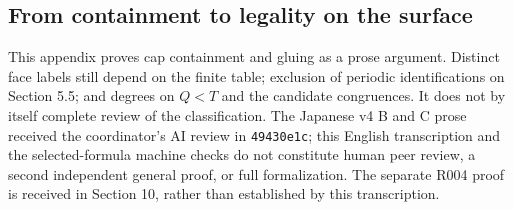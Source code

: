 \documentclass[11pt]{amsart}
\newcommand{\record}[1]{\nolinkurl{#1}}
\begin{document}
\subsection{From containment to legality on the surface}
This appendix proves cap containment and gluing as a prose argument.
Distinct face labels still depend on the finite table; exclusion of
periodic identifications on Section 5.5; and degrees on $Q<T$ and the
candidate congruences. It does not by itself complete review of the
classification. The Japanese v4 B and C prose received the coordinator's
AI review in \record{49430e1c}; this English transcription and the
selected-formula machine checks do not constitute human peer review,
a second independent general proof, or full formalization. The separate
R004 proof is received in Section 10, rather than established by this
transcription.
\end{document}

